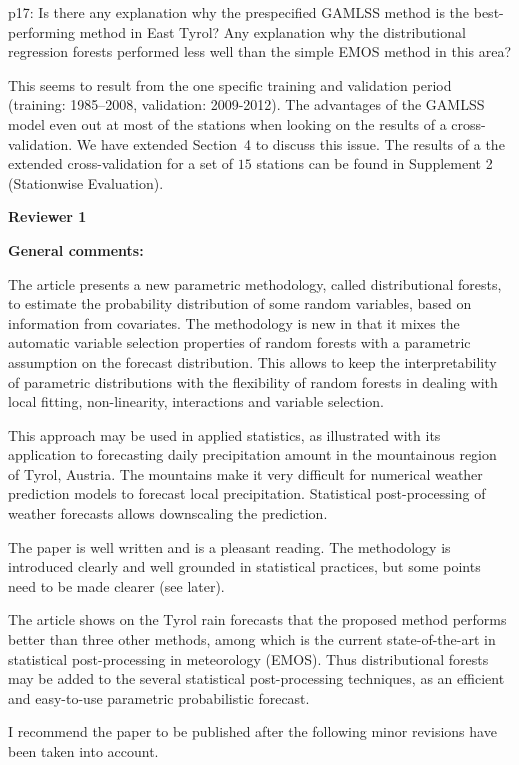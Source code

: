 \documentclass[american,foldmarks=false,noconfig]{uibklttr}
\newenvironment{review}{\fontshape{\itdefault}\fontseries{\bfdefault} \selectfont \smallskip}{\par}
\begin{document}
\begin{review}
p17: Is there any explanation why the prespecified GAMLSS 
method is the best-performing method in East Tyrol? Any 
explanation why the distributional regression forests 
performed less well than the simple EMOS method in this area?
\end{review}

This seems to result from the one specific training and validation period 
(training: 1985--2008, validation: 2009-2012).
The advantages of the GAMLSS model even out at most of the stations when looking 
on the results of a cross-validation. We have extended Section~4 to discuss this 
issue. The results of a the extended cross-validation for a set of $15$ stations 
can be found in Supplement 2 (Stationwise Evaluation).

\newpage


\textbf{\LARGE Reviewer 1}

\bigskip

\textbf{General comments:}

\begin{review}
The article presents a new parametric methodology, called 
distributional forests, to estimate the probability 
distribution of some random variables, based on information 
from covariates. The methodology is new in that it mixes the
automatic variable selection properties of random forests 
with a parametric assumption on the forecast distribution. 
This allows to keep the interpretability of parametric 
distributions with the flexibility of random forests in 
dealing with local fitting, non-linearity, interactions 
and variable selection.

This approach may be used in applied statistics, as 
illustrated with its application to forecasting daily 
precipitation amount in the mountainous region of Tyrol, 
Austria. The mountains make it very difficult for numerical 
weather prediction models to forecast local precipitation. 
Statistical post-processing of weather forecasts allows 
downscaling the prediction.

The paper is well written and is a pleasant reading. 
The methodology is introduced clearly and well grounded 
in statistical practices, but some points need to be 
made clearer (see later).

The article shows on the Tyrol rain forecasts that the 
proposed method performs better than three other methods, 
among which is the current state-of-the-art in statistical 
post-processing in meteorology (EMOS). Thus distributional
forests may be added to the several statistical post-processing 
techniques, as an efficient and easy-to-use parametric 
probabilistic forecast.

I recommend the paper to be published after the following 
minor revisions have been taken into account.
\end{review}
\end{document}
